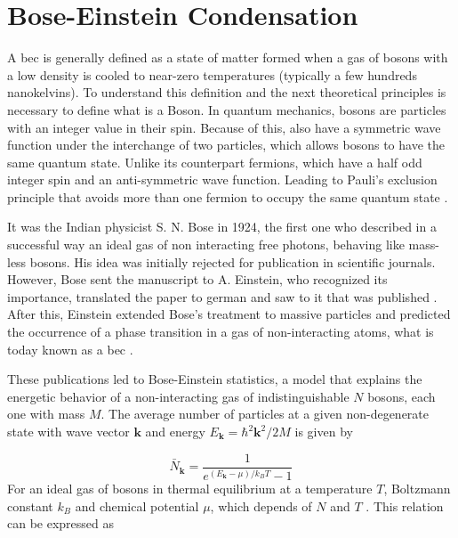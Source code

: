 \section{Bose-Einstein Condensation} \label{sec:bose-einstein_condensation}

A \ac{bec} is generally defined as a state of matter formed when a gas of bosons with a low density is cooled to near-zero temperatures (typically a few hundreds nanokelvins). To understand this definition and the next theoretical principles is necessary to define what is a Boson. In quantum mechanics, bosons are particles with an integer value in their spin. Because of this,  also have a symmetric wave function under the interchange of two particles, which allows bosons to have the same quantum state. Unlike its counterpart fermions, which have a half odd integer spin and an anti-symmetric wave function. Leading to Pauli's exclusion principle that avoids more than one fermion to occupy the same quantum state \cite{Pauli1925}.

It was the Indian physicist S. N. Bose in 1924, the first one who described in a successful way an ideal gas of non interacting free photons, behaving like mass-less bosons. His idea was initially rejected for publication in scientific journals. However, Bose sent the manuscript to A. Einstein, who recognized its importance, translated the paper to german and saw to it that was published \cite{Bose1924}. After this, Einstein extended Bose's treatment to massive particles and predicted the occurrence of a phase transition in a gas of non-interacting atoms, what is today known as a \ac{bec} \cite{Einstein1924, Einstein1925}.

These publications led to Bose-Einstein statistics, a model that explains the energetic behavior of a non-interacting gas of indistinguishable $N$ bosons, each one with mass $M$. The average number of particles at a given non-degenerate state with wave vector $\mathbf{k}$ and energy $E_\mathbf{k} = \hbar^2 \mathbf{k}^2 / 2M$ is given by

\begin{equation}\label{eq:bose-einstein_distribution}
	\bar{N}_{\mathbf{k}} = \frac{1}{e^{(E_\mathbf{k} - \mu)/k_B T} - 1}
\end{equation}
For an ideal gas of bosons in thermal equilibrium at a temperature $T$, Boltzmann constant $k_B$ and chemical potential $\mu$, which depends of $N$ and $T$ \cite{Masahito2010}. This relation can be expressed as

